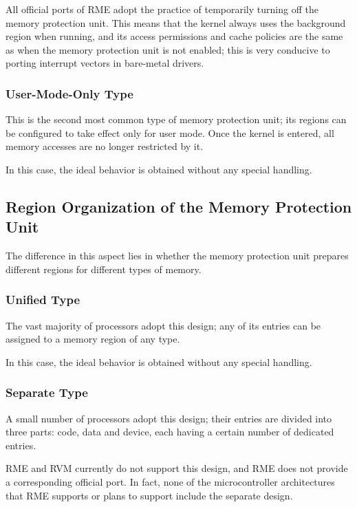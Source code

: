 All official ports of RME adopt the practice of temporarily turning off the memory protection unit. This means that the kernel always uses the background region when running, and its access permissions and cache policies are the same as when the memory protection unit is not enabled; this is very conducive to porting interrupt vectors in bare-metal drivers.

\subsubsection{User-Mode-Only Type}\label{subsubsec:9-mpu-user-mode-only}

This is the second most common type of memory protection unit; its regions can be configured to take effect only for user mode. Once the kernel is entered, all memory accesses are no longer restricted by it.

In this case, the ideal behavior is obtained without any special handling.

\subsection{Region Organization of the Memory Protection Unit}\label{subsec:9-mpu-region-organization}

The difference in this aspect lies in whether the memory protection unit prepares different regions for different types of memory.

\subsubsection{Unified Type}\label{subsubsec:9-mpu-unified}

The vast majority of processors adopt this design; any of its entries can be assigned to a memory region of any type.

In this case, the ideal behavior is obtained without any special handling.

\subsubsection{Separate Type}\label{subsubsec:9-mpu-separate}

A small number of processors adopt this design; their entries are divided into three parts: code, data and device, each having a certain number of dedicated entries.

RME and RVM currently do not support this design, and RME does not provide a corresponding official port. In fact, none of the microcontroller architectures that RME supports or plans to support include the separate design.

